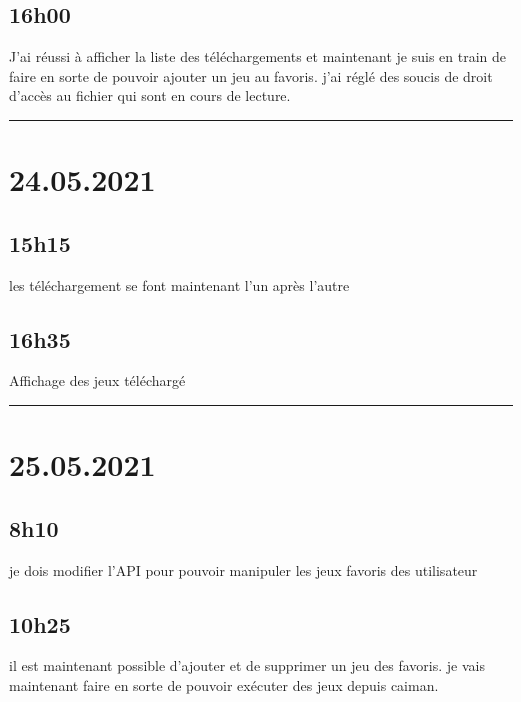 \documentclass[a4paper,12pt,french]{sphinxmanual}
\begin{document}
\subsection{16h00}
\label{\detokenize{logbook:id145}}
\sphinxAtStartPar
J’ai réussi à afficher la liste des téléchargements  et maintenant  je suis en train de faire en sorte de pouvoir ajouter un jeu au favoris. j’ai réglé des soucis de droit d’accès au fichier qui sont en cours de lecture.


\bigskip\hrule\bigskip



\section{24.05.2021}
\label{\detokenize{logbook:id146}}

\subsection{15h15}
\label{\detokenize{logbook:id147}}
\sphinxAtStartPar
les téléchargement se font maintenant l’un après l’autre


\subsection{16h35}
\label{\detokenize{logbook:id148}}
\sphinxAtStartPar
Affichage des jeux téléchargé


\bigskip\hrule\bigskip



\section{25.05.2021}
\label{\detokenize{logbook:id149}}

\subsection{8h10}
\label{\detokenize{logbook:id150}}
\sphinxAtStartPar
je dois modifier l’API pour pouvoir manipuler les jeux favoris des utilisateur


\subsection{10h25}
\label{\detokenize{logbook:h25}}
\sphinxAtStartPar
il est maintenant possible d’ajouter et de supprimer un jeu des favoris.
je vais maintenant faire en sorte de pouvoir exécuter des jeux depuis caiman.
\end{document}
